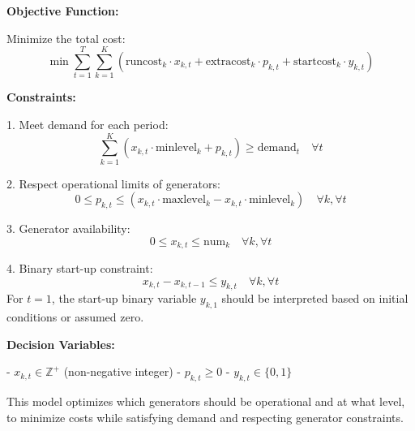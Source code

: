 \documentclass{article}
\begin{document}
\textbf{Objective Function:}

Minimize the total cost:
\[
\min \sum_{t=1}^{T} \sum_{k=1}^{K} \left( \text{runcost}_k \cdot x_{k,t} + \text{extracost}_k \cdot p_{k,t} + \text{startcost}_k \cdot y_{k,t} \right)
\]

\textbf{Constraints:}

1. Meet demand for each period:
\[
\sum_{k=1}^{K} \left( x_{k,t} \cdot \text{minlevel}_k + p_{k,t} \right) \geq \text{demand}_t \quad \forall t
\]

2. Respect operational limits of generators:
\[
0 \leq p_{k,t} \leq (x_{k,t} \cdot \text{maxlevel}_k - x_{k,t} \cdot \text{minlevel}_k) \quad \forall k, \forall t
\]

3. Generator availability:
\[
0 \leq x_{k,t} \leq \text{num}_k \quad \forall k, \forall t
\]

4. Binary start-up constraint:
\[
x_{k,t} - x_{k,t-1} \leq y_{k,t} \quad \forall k, \forall t
\]
For \( t = 1 \), the start-up binary variable \( y_{k,1} \) should be interpreted based on initial conditions or assumed zero.

\textbf{Decision Variables:}

- \( x_{k,t} \in \mathbb{Z}^+ \) (non-negative integer)
- \( p_{k,t} \geq 0 \)
- \( y_{k,t} \in \{0, 1\} \)

This model optimizes which generators should be operational and at what level, to minimize costs while satisfying demand and respecting generator constraints.
\end{document}
